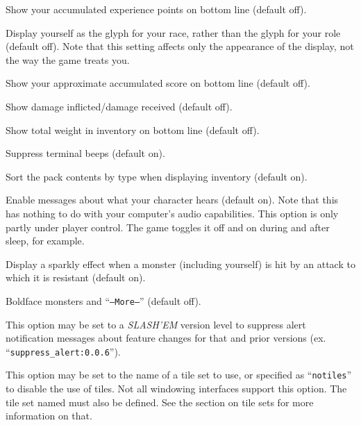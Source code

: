 \item[\ib{showexp}]
Show your accumulated experience points on bottom line (default off).

\item[\ib{showrace}]
Display yourself as the glyph for your race, rather than the glyph
for your role (default off).  Note that this setting affects only
the appearance of the display, not the way the game treats you.

\item[\ib{showscore}]
Show your approximate accumulated score on bottom line (default off).

\item[\ib{showdmg}]
Show damage inflicted/damage received (default off).

\item[\ib{showweight}]
Show total weight in inventory on bottom line (default off).

\item[\ib{silent}]
Suppress terminal beeps (default on).

\item[\ib{sortpack}]
Sort the pack contents by type when displaying inventory (default on).

\item[\ib{sound}]
Enable messages about what your character hears (default on).
Note that this has nothing to do with your computer's audio capabilities.
This option is only partly under player control.  The game toggles it
off and on during and after sleep, for example.

\item[\ib{sparkle}]
Display a sparkly effect when a monster (including yourself) is hit by an
attack to which it is resistant (default on).

\item[\ib{standout}]
Boldface monsters and ``{\tt --More--}'' (default off).

\item[\ib{suppress\_alert}]
This option may be set to a {\it SLASH'EM\/} version level to suppress
alert notification messages about feature changes for that 
and prior versions (ex. ``{\tt suppress\_alert:0.0.6}'').

\item[\ib{tiles}]
This option may be set to the name of a tile set to use, or specified
as ``{\tt notiles}'' to disable the use of tiles. Not all windowing interfaces
support this option. The tile set named must also be defined. See the
section on tile sets for more information on that.

